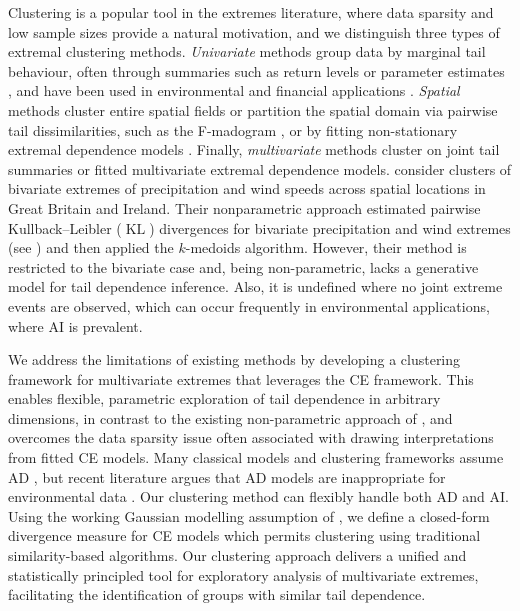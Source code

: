 \documentclass[preprint,12pt,authoryear]{elsarticle}
\DeclareMathOperator{\KL}{KL}
\begin{document}
Clustering is a popular tool in the extremes literature, where data sparsity and low sample sizes provide a natural motivation, and we distinguish three types of extremal clustering methods.
\emph{Univariate} methods group data by marginal tail behaviour, often through summaries such as return levels or parameter estimates \citep{Coles2001}, and have been used in environmental and financial applications \citep{Alonso2014-rr, deCarvalho2023, Zheng2023-jf}.
\emph{Spatial} methods cluster entire spatial fields or partition the spatial domain via pairwise tail dissimilarities, such as the F-madogram \citep{Cooley2006variograms, Bernard2013}, or by fitting non-stationary extremal dependence models \citep{Carreau2017, Rohrbeck2021, Dupuis2023, Shao2025}. 
Finally, \emph{multivariate} methods cluster on joint tail summaries or fitted multivariate extremal dependence models. 
\citet{Vignotto2021} consider clusters of bivariate extremes of precipitation and wind speeds across spatial locations in Great Britain and Ireland.
Their nonparametric approach estimated pairwise Kullback--Leibler ($\KL{}$) \citep{Kullback1951} divergences for bivariate precipitation and wind extremes (see \citet{Zscheischler2021}) and then applied the $k$-medoids algorithm. 
However, their method is restricted to the bivariate case and,
being non-parametric, lacks a generative model for tail dependence inference. 
Also, it is undefined where no joint extreme events are observed, which can occur frequently in environmental applications, where AI is prevalent.

We address the limitations of existing methods by developing a clustering framework for multivariate extremes that leverages the CE framework. 
This enables flexible, parametric exploration of tail dependence in arbitrary dimensions, in contrast to the existing non-parametric approach of \citet{Vignotto2021}, and overcomes the data sparsity issue often associated with drawing interpretations from fitted CE models.
Many classical models and clustering frameworks assume AD \citep{Vignotto2021,Boulin2025}, but recent literature argues that AD models are inappropriate for environmental data \citep{Opitz2016,Dawkins2018,Huser2024}. 
Our clustering method can flexibly handle both AD and AI. 
Using the working Gaussian modelling assumption of \citet{Heffernan2004}, we define a closed-form divergence measure for CE models which permits clustering using traditional similarity-based algorithms. 
Our clustering approach delivers a unified and statistically principled tool for exploratory analysis of multivariate extremes, facilitating the identification of groups with similar tail dependence. 
\end{document}

